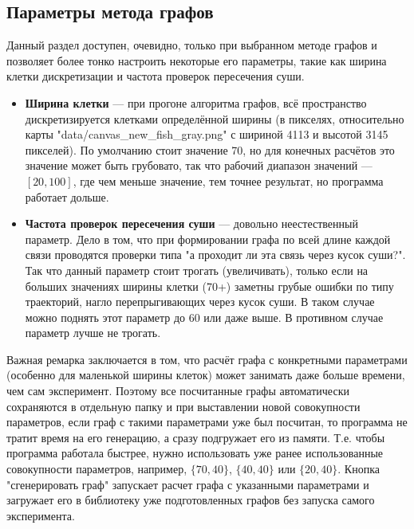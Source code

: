 \documentclass{article}
\begin{document}
\subsection{Параметры метода графов} Данный раздел доступен, очевидно, только при выбранном методе графов и позволяет более тонко настроить некоторые его параметры, такие как ширина клетки дискретизации и частота проверок пересечения суши. 
    \begin{itemize}
        \item \textbf{Ширина клетки} --- при прогоне алгоритма графов, всё пространство дискретизируется клетками определённой ширины (в пикселях, относительно карты "data/canvas\_new\_fish\_gray.png" с шириной 4113 и высотой 3145 пикселей). По умолчанию стоит значение 70, но для конечных расчётов это значение может быть грубовато, так что рабочий диапазон значений --- \textbf{$[20, 100]$}, где чем меньше значение, тем точнее результат, но программа работает дольше. 
        \item \textbf{Частота проверок пересечения суши} --- довольно неестественный параметр. Дело в том, что при формировании графа по всей длине каждой связи проводятся проверки типа "а проходит ли эта связь через кусок суши?". Так что данный параметр стоит трогать (увеличивать), только если на больших значениях ширины клетки (70+) заметны грубые ошибки по типу траекторий, нагло перепрыгивающих через кусок суши. В таком случае можно поднять этот параметр до 60 или даже выше. В противном случае параметр лучше не трогать.
    \end{itemize}
    Важная ремарка заключается в том, что расчёт графа с конкретными параметрами (особенно для маленькой ширины клеток) может занимать даже больше времени, чем сам эксперимент. Поэтому все посчитанные графы автоматически сохраняются в отдельную папку и при выставлении новой совокупности параметров, если граф с такими параметрами уже был посчитан, то программа не тратит время на его генерацию, а сразу подгружает его из памяти. Т.е. чтобы программа работала быстрее, нужно использовать уже ранее использованные совокупности параметров, например, \textbf{$\{70, 40\}$}, \textbf{$\{40, 40\}$} или \textbf{$\{20, 40\}$}.
    Кнопка "сгенерировать граф" запускает расчет графа с указанными параметрами и загружает его в библиотеку уже подготовленных графов без запуска самого эксперимента.
\end{document}
